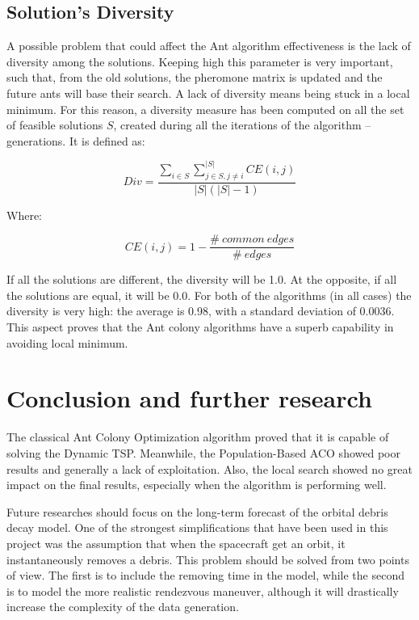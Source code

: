 \documentclass[a4paper,9pt,journal,twoside,compsoc]{PPIEEEtran}
\begin{document}
\subsection{Solution's Diversity}
A possible problem that could affect the Ant algorithm effectiveness is the lack of diversity among the solutions. Keeping high this parameter is very important, such that, from the old solutions, the pheromone matrix is updated and the future ants will base their search. A lack of diversity means being stuck in a local minimum. For this reason, a diversity measure has been computed on all the set of feasible solutions $S$, created during all the iterations of the algorithm -- generations. It is defined as:

\begin{equation}
Div = \frac{\sum_{i \in S}\sum_{j \in S, j \neq i}^{|S|} CE(i, j)}{|S|(|S| - 1)}
\end{equation}

Where:

\begin{equation}
CE(i, j) = 1 - \frac{\#~common~edges}{\#~edges}
\end{equation}

If all the solutions are different, the diversity will be 1.0. At the opposite, if all the solutions are equal, it will be 0.0. For both of the algorithms (in all cases) the diversity is very high: the average is 0.98, with a standard deviation of 0.0036. This aspect proves that the Ant colony algorithms have a superb capability in avoiding local minimum.

 

\section{Conclusion and further research}
The classical Ant Colony Optimization algorithm proved that it is capable of solving the Dynamic TSP. Meanwhile, the Population-Based ACO showed poor results and generally a lack of exploitation. Also, the local search showed no great impact on the final results, especially when the algorithm is performing well. 

Future researches should focus on the long-term forecast of the orbital debris decay model.
One of the strongest simplifications that have been used in this project was the assumption that when the spacecraft get an orbit, it instantaneously removes a debris. This problem should be solved from two points of view. The first is to include the removing time in the model, while the second is to model the more realistic rendezvous maneuver, although it will drastically increase the complexity of the data generation.
\end{document}
